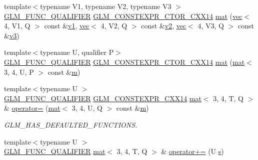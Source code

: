 \begin{DoxyCompactItemize}
\item 
{\footnotesize template$<$typename V1, typename V2, typename V3 $>$ }\\\hyperlink{setup_8hpp_a33fdea6f91c5f834105f7415e2a64407}{G\+L\+M\+\_\+\+F\+U\+N\+C\+\_\+\+Q\+U\+A\+L\+I\+F\+I\+ER} \hyperlink{setup_8hpp_a0900f9145e68bf6061b6f5e7be3fa751}{G\+L\+M\+\_\+\+C\+O\+N\+S\+T\+E\+X\+P\+R\+\_\+\+C\+T\+O\+R\+\_\+\+C\+X\+X14} \hyperlink{structglm_1_1mat_3_013_00_014_00_01_t_00_01_q_01_4_ac2826bfed2065c9ecd22ac59bd41488b}{mat} (\hyperlink{structglm_1_1vec}{vec}$<$ 4, V1, Q $>$ const \&\hyperlink{_s_d_l__opengl__glext_8h_a435c176a02c061b43e19bdf7c86cceae}{v1}, \hyperlink{structglm_1_1vec}{vec}$<$ 4, V2, Q $>$ const \&\hyperlink{_s_d_l__opengl__glext_8h_a0928f6d0f0f794ba000a21dfae422136}{v2}, \hyperlink{structglm_1_1vec}{vec}$<$ 4, V3, Q $>$ const \&\hyperlink{_s_d_l__opengl__glext_8h_acc806b31cbf466ceba6555983d8b814d}{v3})
\item 
{\footnotesize template$<$typename U, qualifier P$>$ }\\\hyperlink{setup_8hpp_a33fdea6f91c5f834105f7415e2a64407}{G\+L\+M\+\_\+\+F\+U\+N\+C\+\_\+\+Q\+U\+A\+L\+I\+F\+I\+ER} \hyperlink{setup_8hpp_a0900f9145e68bf6061b6f5e7be3fa751}{G\+L\+M\+\_\+\+C\+O\+N\+S\+T\+E\+X\+P\+R\+\_\+\+C\+T\+O\+R\+\_\+\+C\+X\+X14} \hyperlink{structglm_1_1mat_3_013_00_014_00_01_t_00_01_q_01_4_a3cecec80a6625a5cccb51d98f04d96a4}{mat} (\hyperlink{structglm_1_1mat}{mat}$<$ 3, 4, U, P $>$ const \&\hyperlink{_s_d_l__opengl__glext_8h_af593500c283bf1a787a6f947f503a5c2}{m})
\item 
{\footnotesize template$<$typename U $>$ }\\\hyperlink{setup_8hpp_a33fdea6f91c5f834105f7415e2a64407}{G\+L\+M\+\_\+\+F\+U\+N\+C\+\_\+\+Q\+U\+A\+L\+I\+F\+I\+ER} \hyperlink{setup_8hpp_a4dd12abf5e1164bc57f3a34671d03844}{G\+L\+M\+\_\+\+C\+O\+N\+S\+T\+E\+X\+P\+R\+\_\+\+C\+X\+X14} \hyperlink{structglm_1_1mat}{mat}$<$ 3, 4, T, Q $>$ \& \hyperlink{structglm_1_1mat_3_013_00_014_00_01_t_00_01_q_01_4_aac8347d8c60d7b5eac67387ca84f39f6}{operator=} (\hyperlink{structglm_1_1mat}{mat}$<$ 3, 4, U, Q $>$ const \&\hyperlink{_s_d_l__opengl__glext_8h_af593500c283bf1a787a6f947f503a5c2}{m})
\begin{DoxyCompactList}\small\item\em G\+L\+M\+\_\+\+H\+A\+S\+\_\+\+D\+E\+F\+A\+U\+L\+T\+E\+D\+\_\+\+F\+U\+N\+C\+T\+I\+O\+NS. \end{DoxyCompactList}\item 
{\footnotesize template$<$typename U $>$ }\\\hyperlink{setup_8hpp_a33fdea6f91c5f834105f7415e2a64407}{G\+L\+M\+\_\+\+F\+U\+N\+C\+\_\+\+Q\+U\+A\+L\+I\+F\+I\+ER} \hyperlink{structglm_1_1mat}{mat}$<$ 3, 4, T, Q $>$ \& \hyperlink{structglm_1_1mat_3_013_00_014_00_01_t_00_01_q_01_4_a8b2499990108087ab7e9bcc364ead6b1}{operator+=} (U \hyperlink{_s_d_l__opengl_8h_a4af680a6c683f88ed67b76f207f2e6e4}{s})

\end{DoxyCompactItemize}
